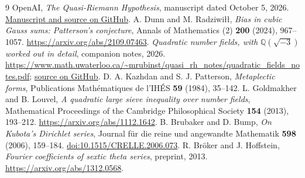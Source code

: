 \documentclass[11pt]{article}
\numberwithin{equation}{section}
\begin{document}
\begin{thebibliography}{9}
 OpenAI, \emph{The Quasi-Riemann Hypothesis},
manuscript dated October 5, 2026.
\href{https://github.com/openai/math/tree/main/preprints/The-Quasi-Riemann-Hypothesis-October-5-2026}{Manuscript and source on GitHub}.
 A. Dunn and M. Radziwi\l\l,
\emph{Bias in cubic Gauss sums: Patterson's conjecture},
Annals of Mathematics (2) \textbf{200} (2024), 967--1057.
\url{https://arxiv.org/abs/2109.07463}.
 \emph{Quadratic number fields, with $\mathbb Q(\sqrt{-3})$ worked out in detail},
companion notes, 2026.
\url{https://www.math.uwaterloo.ca/~mrubinst/quasi_rh_notes/quadratic_fields_notes.pdf};
\href{https://github.com/mrubinst/L-function_zero_free_strips/tree/main/quadratic_fields_notes}{source on GitHub}.
 D. A. Kazhdan and S. J. Patterson, \emph{Metaplectic forms},
Publications Math\'ematiques de l'IH\'ES \textbf{59} (1984), 35--142.
 L. Goldmakher and B. Louvel,
\emph{A quadratic large sieve inequality over number fields},
Mathematical Proceedings of the Cambridge Philosophical Society
\textbf{154} (2013), 193--212.
\url{https://arxiv.org/abs/1112.1642}.
 B. Brubaker and D. Bump,
\emph{On Kubota's Dirichlet series},
Journal f\"ur die reine und angewandte Mathematik \textbf{598} (2006), 159--184.
\href{https://doi.org/10.1515/CRELLE.2006.073}{doi:10.1515/CRELLE.2006.073}.
 R. Br\"oker and J. Hoffstein,
\emph{Fourier coefficients of sextic theta series}, preprint, 2013.
\url{https://arxiv.org/abs/1312.0568}.
\end{thebibliography}
\end{document}
